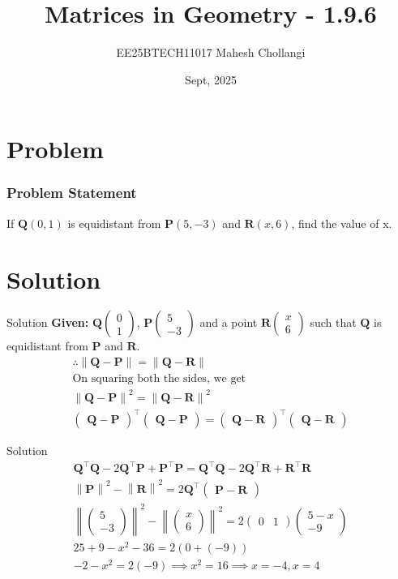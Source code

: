 \documentclass{beamer}
\title{Matrices in Geometry - 1.9.6}
\author{EE25BTECH11017 Mahesh Chollangi}
\date{Sept, 2025}
\let\vec\mathbf
\providecommand{\brak}[1]{\ensuremath{\left(#1\right)}}
\theoremstyle{remark}
\providecommand{\norm}[1]{\left\lVert#1\right\rVert}
\newcommand{\myvec}[1]{\ensuremath{\begin{pmatrix}#1\end{pmatrix}}}
\begin{document}
\maketitle


\section{Problem}
\begin{frame}
\frametitle{Problem Statement}
 If $\vec{Q}\brak{0,1}$ is equidistant from $\vec{P}\brak{5,-3}$ and $\vec{R}\brak{x,6}$, find the value of x.
\end{frame}

\section{Solution}
\begin{frame}{Solution}
   \textbf{Given: } 
$\vec{Q}\myvec{0\\1}$, $\vec{P}\myvec{5\\-3}$ and a point $\vec{R} \myvec{x \\ 6}$ such that $\vec{Q}$ is equidistant from $\vec{P}$ and $\vec{R}$. 
\begin{align}
     \therefore \norm{\vec{Q}-\vec{P}}=\norm{\vec{Q}-\vec{R}}\\
    \text{On squaring both the sides, we get }\\
    \norm{\vec{Q}-\vec{P}}^2=\norm{\vec{Q}-\vec{R}}^2\\
    \myvec{\vec{Q}-\vec{P}}^{\top}\myvec{\vec{Q}-\vec{P}}=\myvec{\vec{Q}-\vec{R}}^{\top}\myvec{\vec{Q}-\vec{R}}
\end{align}
\end{frame}

\begin{frame}{Solution}
\begin{align}
    \vec{Q}^{\top}\vec{Q} - 2\vec{Q}^{\top}\vec{P} + \vec{P}^{\top}\vec{P} =\vec{Q}^{\top}\vec{Q} - 2\vec{Q}^{\top}\vec{R} + \vec{R}^{\top}\vec{R}\\
    \norm{\vec{P}}^2 - \norm{\vec{R}}^2=2\vec{Q}^{\top}\myvec{\vec{P}-\vec{R}}\\
    \norm{\myvec{5\\-3}}^2 - \norm{\myvec{x\\6}}^2=2\myvec{0 & 1}\myvec{5-x \\ -9}\\
    25+9- x^2 -36=2\brak{0 + (-9)}\\
    -2 -x^2=2\brak{-9} \implies x^2=16 \implies x= -4 , x= 4
\end{align}
\end{frame}
\end{document}
